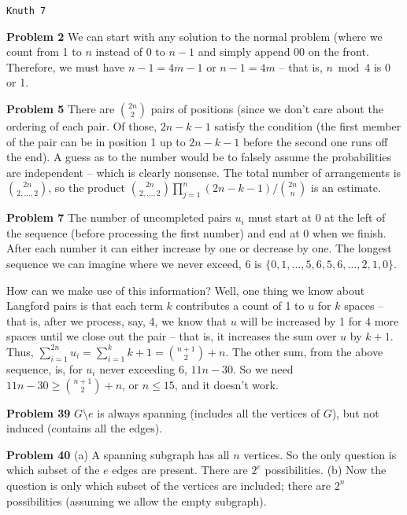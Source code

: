 \topglue 0.5in
\centerline{\tt Knuth 7}
\vskip 0.3in

\noindent
{\bf Problem 2} We can start with any solution to the normal problem (where we count
from 1 to $n$ instead of 0 to $n-1$ and simply
append 00 on the front.  Therefore, we must have $n-1 = 4m - 1$ or $n-1 = 4m$ --
that is, $n \bmod 4$ is 0 or 1.

\vskip 0.1in
\noindent
{\bf Problem 5} There are $2 n \choose 2$ pairs of positions (since we don't care about 
the ordering of each pair.  Of those, $2 n - k - 1$ satisfy the condition (the first member of the 
pair can be in position 1 up to $2 n - k - 1$ before the second one runs off the end).
A guess as to the number would be to falsely assume the probabilities are independent --
which is clearly nonsense.  The total number of arrangements is $2 n \choose 2, \ldots, 2$,
so the product  ${2 n \choose 2, \ldots, 2} \prod_{j=1}^n \left(2 n - k - 1\right) / {2 n \choose n}$
is an estimate.

\vskip 0.1in
\noindent
{\bf Problem 7} The number of uncompleted pairs $u_i$ must start at 0 at the left of
the sequence (before processing the first number) and end at 0 when we finish.
After each number it can either increase by one or decrease by one.  The longest
sequence we can imagine where we never exceed, 6 is
$\{0, 1, \ldots, 5, 6, 5, 6, \ldots, 2, 1, 0\}$.

How can we make use of this information?  Well, one thing we know about Langford
pairs is that each term $k$ contributes a count of 1 to $u$ for $k$ spaces -- that
is, after we process, say, 4, we know that $u$ will be increased by 1 for 4 more spaces
until we close out the pair -- that is, it increases the sum over $u$ by $k+1$.
Thus, $\sum_{i=1}^{2 n} u_i = \sum_{i=1}^{k} k + 1 = {n+1 \choose 2} + n$.  The
other sum, from the above sequence, is, for $u_i$ never exceeding 6,
$11 n - 30$.  So we need $11  n - 30 \ge {n + 1 \choose 2} + n$, or $n \le 15$,
and it doesn't work.

\vskip 0.1in
\noindent
{\bf Problem 39} $G \setminus e$ is always spanning (includes all the vertices of $G$),
but not induced (contains all the edges).

\vskip 0.1in
\noindent
{\bf Problem 40} (a) A spanning subgraph has all $n$ vertices.  So the only
question is which subset of the $e$ edges are present.  There are $2^e$ 
possibilities. (b) Now the question is only which subset of the vertices
are included; there are $2^n$ possibilities (assuming we allow the empty
subgraph).

